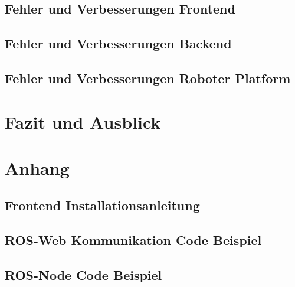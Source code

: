 \documentclass[11pt,oneside,a4paper,titlepage]{article}
\begin{document}
\subsection{Fehler und Verbesserungen Frontend}


\subsection{Fehler und Verbesserungen Backend}


\subsection{Fehler und Verbesserungen Roboter Platform}


\section{Fazit und Ausblick}


\section{Anhang}
\subsection{Frontend Installationsanleitung}


\subsection{ROS-Web Kommunikation Code Beispiel}


\subsection{ROS-Node Code Beispiel}


\newpage
\listoffigures

\newpage


\end{document}
